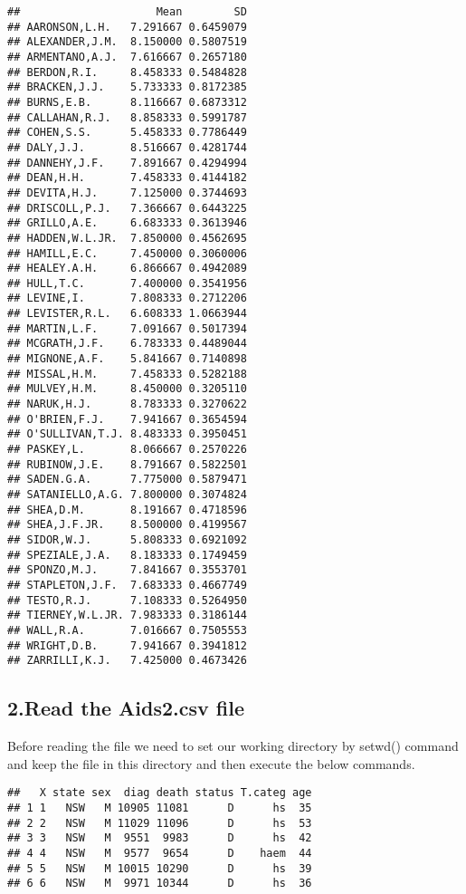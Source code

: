 \documentclass[
]{article}
\begin{document}
\begin{verbatim}
##                     Mean        SD
## AARONSON,L.H.   7.291667 0.6459079
## ALEXANDER,J.M.  8.150000 0.5807519
## ARMENTANO,A.J.  7.616667 0.2657180
## BERDON,R.I.     8.458333 0.5484828
## BRACKEN,J.J.    5.733333 0.8172385
## BURNS,E.B.      8.116667 0.6873312
## CALLAHAN,R.J.   8.858333 0.5991787
## COHEN,S.S.      5.458333 0.7786449
## DALY,J.J.       8.516667 0.4281744
## DANNEHY,J.F.    7.891667 0.4294994
## DEAN,H.H.       7.458333 0.4144182
## DEVITA,H.J.     7.125000 0.3744693
## DRISCOLL,P.J.   7.366667 0.6443225
## GRILLO,A.E.     6.683333 0.3613946
## HADDEN,W.L.JR.  7.850000 0.4562695
## HAMILL,E.C.     7.450000 0.3060006
## HEALEY.A.H.     6.866667 0.4942089
## HULL,T.C.       7.400000 0.3541956
## LEVINE,I.       7.808333 0.2712206
## LEVISTER,R.L.   6.608333 1.0663944
## MARTIN,L.F.     7.091667 0.5017394
## MCGRATH,J.F.    6.783333 0.4489044
## MIGNONE,A.F.    5.841667 0.7140898
## MISSAL,H.M.     7.458333 0.5282188
## MULVEY,H.M.     8.450000 0.3205110
## NARUK,H.J.      8.783333 0.3270622
## O'BRIEN,F.J.    7.941667 0.3654594
## O'SULLIVAN,T.J. 8.483333 0.3950451
## PASKEY,L.       8.066667 0.2570226
## RUBINOW,J.E.    8.791667 0.5822501
## SADEN.G.A.      7.775000 0.5879471
## SATANIELLO,A.G. 7.800000 0.3074824
## SHEA,D.M.       8.191667 0.4718596
## SHEA,J.F.JR.    8.500000 0.4199567
## SIDOR,W.J.      5.808333 0.6921092
## SPEZIALE,J.A.   8.183333 0.1749459
## SPONZO,M.J.     7.841667 0.3553701
## STAPLETON,J.F.  7.683333 0.4667749
## TESTO,R.J.      7.108333 0.5264950
## TIERNEY,W.L.JR. 7.983333 0.3186144
## WALL,R.A.       7.016667 0.7505553
## WRIGHT,D.B.     7.941667 0.3941812
## ZARRILLI,K.J.   7.425000 0.4673426
\end{verbatim}

\hypertarget{read-the-aids2.csv-file}{%
\subsection{2.Read the Aids2.csv file}\label{read-the-aids2.csv-file}}

Before reading the file we need to set our working directory by setwd()
command and keep the file in this directory and then execute the below
commands.

\begin{verbatim}
##   X state sex  diag death status T.categ age
## 1 1   NSW   M 10905 11081      D      hs  35
## 2 2   NSW   M 11029 11096      D      hs  53
## 3 3   NSW   M  9551  9983      D      hs  42
## 4 4   NSW   M  9577  9654      D    haem  44
## 5 5   NSW   M 10015 10290      D      hs  39
## 6 6   NSW   M  9971 10344      D      hs  36
\end{verbatim}
\end{document}

